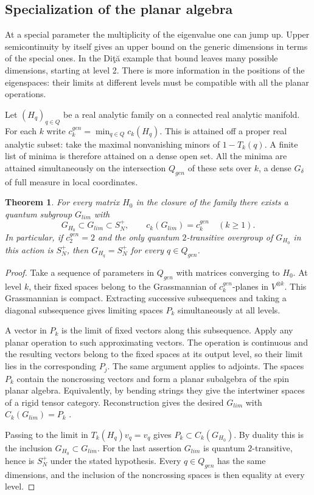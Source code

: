 \documentclass[11pt,a4paper]{amsart}
\newtheorem{theorem}{Theorem}[section]
\begin{document}
\subsection{Specialization of the planar algebra}
At a special parameter the multiplicity of the eigenvalue one can jump up. Upper semicontinuity by itself gives an upper bound on the generic dimensions in terms of the special ones. In the Di\c t\u a example that bound leaves many possible dimensions, starting at level 2. There is more information in the positions of the eigenspaces: their limits at different levels must be compatible with all the planar operations.

Let $(H_q)_{q\in Q}$ be a real analytic family on a connected real analytic manifold. For each $k$ write $c_k^{gen}=\min_{q\in Q}c_k(H_q)$. This is attained off a proper real analytic subset: take the maximal nonvanishing minors of $1-T_k(q)$. A finite list of minima is therefore attained on a dense open set. All the minima are attained simultaneously on the intersection $Q_{gen}$ of these sets over $k$, a dense $G_\delta$ of full measure in local coordinates.

\begin{theorem}\label{thm:limit}
For every matrix $H_0$ in the closure of the family there exists a quantum subgroup $G_{lim}$ with
\[
 G_{H_0}\subset G_{lim}\subset S_N^+,
 \qquad c_k(G_{lim})=c_k^{gen}\quad(k\geq1).
\]
In particular, if $c_2^{gen}=2$ and the only quantum $2$-transitive overgroup of $G_{H_0}$ in this action is $S_N^+$, then $G_{H_q}=S_N^+$ for every $q\in Q_{gen}$.
\end{theorem}
\begin{proof}
Take a sequence of parameters in $Q_{gen}$ with matrices converging to $H_0$. At level $k$, their fixed spaces belong to the Grassmannian of $c_k^{gen}$-planes in $V^{\otimes k}$. This Grassmannian is compact. Extracting successive subsequences and taking a diagonal subsequence gives limiting spaces $P_k$ simultaneously at all levels.

A vector in $P_k$ is the limit of fixed vectors along this subsequence. Apply any planar operation to such approximating vectors. The operation is continuous and the resulting vectors belong to the fixed spaces at its output level, so their limit lies in the corresponding $P_j$. The same argument applies to adjoints. The spaces $P_k$ contain the noncrossing vectors and form a planar subalgebra of the spin planar algebra. Equivalently, by bending strings they give the intertwiner spaces of a rigid tensor category. Reconstruction gives the desired $G_{lim}$ with $C_k(G_{lim})=P_k$ \cite{ba2,wo2}.

Passing to the limit in $T_k(H_q)v_q=v_q$ gives $P_k\subset C_k(G_{H_0})$. By duality this is the inclusion $G_{H_0}\subset G_{lim}$. For the last assertion $G_{lim}$ is quantum $2$-transitive, hence is $S_N^+$ under the stated hypothesis. Every $q\in Q_{gen}$ has the same dimensions, and the inclusion of the noncrossing spaces is then equality at every level.
\end{proof}
\end{document}
